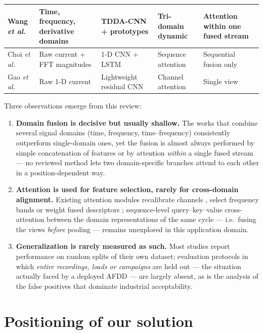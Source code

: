 \begin{table}[H]
\begin{tabular}{|p{2.5cm}|p{3.6cm}|p{3.1cm}|p{2.1cm}|p{2.5cm}|}
\hline
Wang \emph{et al.} \cite{wang2026tdda} & Time, frequency, derivative domains & TDDA-CNN + prototypes & Tri-domain dynamic & Attention within one fused stream \\
\hline
Choi \emph{et al.} \cite{choi2024feature} & Raw current + FFT magnitudes & 1-D CNN + LSTM & Sequence attention & Sequential fusion only \\
\hline
Gao \emph{et al.} \cite{gao2023channel} & Raw 1-D current & Lightweight residual CNN & Channel attention & Single view \\
\hline
\end{tabular}
\end{table}

Three observations emerge from this review:

\begin{enumerate}[itemsep=2pt]
    \item \textbf{Domain fusion is decisive but usually shallow.} The works that combine several signal domains (time, frequency, time--frequency) consistently outperform single-domain ones, yet the fusion is almost always performed by simple concatenation of features or by attention \emph{within} a single fused stream --- no reviewed method lets two domain-specific branches attend to each other in a position-dependent way.
    \item \textbf{Attention is used for feature selection, rarely for cross-domain alignment.} Existing attention modules recalibrate channels \cite{huang2025shufflenet,gao2023channel}, select frequency bands \cite{ning2024interp} or weight fused descriptors \cite{qu2023multimodal,wang2026tdda}; sequence-level query--key--value cross-attention between the domain representations of the same cycle --- i.e.\ fusing the views \emph{before} pooling --- remains unexplored in this application domain.
    \item \textbf{Generalization is rarely measured as such.} Most studies report performance on random splits of their own dataset; evaluation protocols in which \emph{entire recordings, loads or campaigns} are held out --- the situation actually faced by a deployed AFDD --- are largely absent, as is the analysis of the false positives that dominate industrial acceptability.
\end{enumerate}

\section{Positioning of our solution}
\label{sec:sota-positioning}

